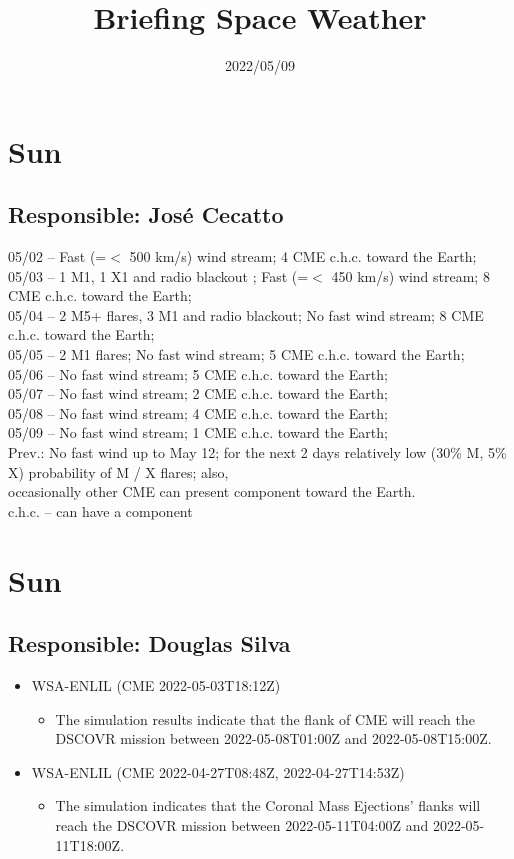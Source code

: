 \documentclass[a4paper, 10pt]{article}
\title{\Large{\textbf{Briefing Space Weather}}}
\date{2022/05/09}
\begin{document}
\maketitle 

  \thispagestyle{fancy} \section{Sun} 
 \subsection{Responsible: José Cecatto}

05/02 – Fast (=$<$ 500 km/s) wind stream; 4 CME c.h.c. toward the Earth; \\ 05/03 – 1 M1, 1 X1 and radio blackout ; Fast (=$<$ 450 km/s) wind stream; 8 CME c.h.c. toward the Earth; \\ 05/04 – 2 M5+ flares, 3 M1 and radio blackout; No fast wind stream; 8 CME c.h.c. toward the Earth; \\ 05/05 – 2 M1 flares; No fast wind stream; 5 CME c.h.c. toward the Earth; \\ 05/06 – No fast wind stream; 5 CME c.h.c. toward the Earth; \\ 05/07 – No fast wind stream; 2 CME c.h.c. toward the Earth; \\ 05/08 – No fast wind stream; 4 CME c.h.c. toward the Earth; \\ 05/09 – No fast wind stream; 1 CME c.h.c. toward the Earth; \\ Prev.: No fast wind up to May 12; for the next 2 days relatively low (30\% M, 5\% X) probability of M / X flares; also, \\ occasionally other CME can present component toward the Earth. \\ c.h.c. – can have a component\section{Sun} 
 \subsection{Responsible: Douglas Silva}

\begin{itemize} 
 \item WSA-ENLIL (CME 2022-05-03T18:12Z)
\begin{itemize} 
 \item The simulation results indicate that the flank of CME will reach the DSCOVR mission between 2022-05-08T01:00Z and 2022-05-08T15:00Z.
\end{itemize} 
 \item WSA-ENLIL (CME 2022-04-27T08:48Z, 2022-04-27T14:53Z)
\begin{itemize} 
 \item The simulation indicates that the Coronal Mass Ejections’ flanks will reach the DSCOVR mission between 2022-05-11T04:00Z and 2022-05-11T18:00Z. 
\end{itemize} 
 \end{itemize} 
 
\end{document}
